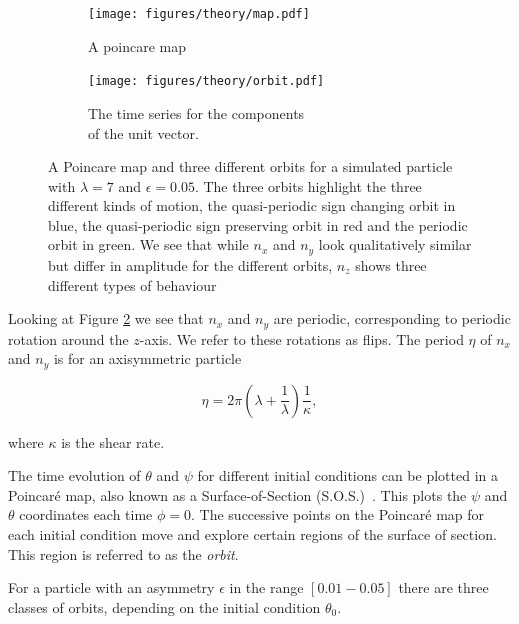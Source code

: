 \begin{figure}[H]
\centering
\begin{subfigure}[b]{0.45\textwidth}
\texttt{[image: figures/theory/map.pdf]}
\caption{A poincare map}\label{fig:orbitmap}
\end{subfigure}\hspace{1em}%
\begin{subfigure}[b]{0.5\textwidth}
\texttt{[image: figures/theory/orbit.pdf]}
\caption{The time series for the components \\ of the unit vector.}\label{fig:orbitparams}
\end{subfigure}
\caption{A Poincare map and three different orbits for a simulated particle with $\lambda=7$ and $\epsilon=0.05$. The three orbits highlight the three different kinds of motion, the quasi-periodic sign changing orbit in blue, the quasi-periodic sign preserving orbit in red and the periodic orbit in green. We see that while $n_x$ and $n_y$ look qualitatively similar but differ in amplitude for the different orbits, $n_z$ shows three different types of behaviour}
\label{fig:orbittypes}
\end{figure}



Looking at Figure \ref{fig:orbitparams} we see that $n_x$ and $n_y$ are periodic, corresponding to periodic rotation around the $z$-axis. We refer to these rotations as flips. The period $\eta$ of $n_x$ and $n_y$ is for an axisymmetric particle \cite{Jeffery}

\begin{equation}\label{eq:flipRate}
\eta = 2\pi \left( \lambda + \frac{1}{\lambda} \right)\frac{1}{\kappa},
\end{equation}

\noindent where $\kappa$ is the shear rate. 

The time evolution of $\theta$ and $\psi$ for different initial conditions can be plotted in a Poincaré map, also known as a Surface-of-Section (S.O.S.)~\cite{poincare}. This plots the $\psi$ and $\theta$ coordinates each time $\phi = 0$. The successive points on the Poincaré map for each initial condition move and explore certain regions of the surface of section. This region is referred to as the \emph{orbit}. 

For a particle with an asymmetry $\epsilon$ in the range $\left[0.01-0.05\right]$ there are three classes of orbits, depending on the initial condition $\theta_0$.


